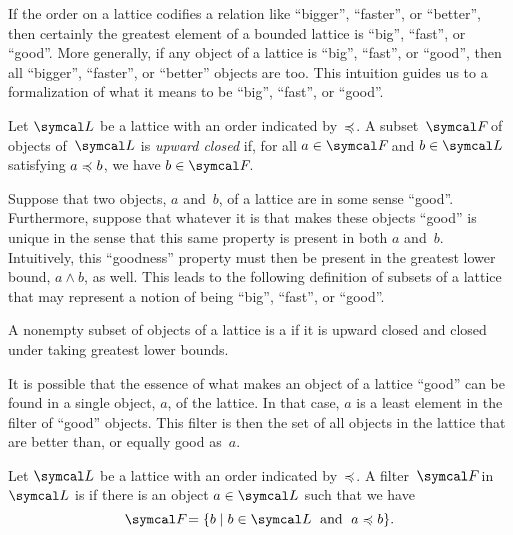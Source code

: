 If the order on a lattice codifies a relation like \enquote{bigger}, \enquote{faster}, or \enquote{better}, then certainly the greatest element of a bounded lattice is \enquote{big}, \enquote{fast}, or \enquote{good}.
More generally, if any object of a lattice is \enquote{big}, \enquote{fast}, or \enquote{good}, then all \enquote{bigger}, \enquote{faster}, or \enquote{better} objects are too.
This intuition guides us to a formalization of what it means to be \enquote{big}, \enquote{fast}, or \enquote{good}.
\begin{definition}
  Let $\calL$ be a lattice with an order indicated by~$\preccurlyeq$.
  A subset~$\calF$ of objects of~$\calL$ is \emph{upward closed} if, for all $a \in \calF$ and $b \in \calL$ satisfying $a \preccurlyeq b$, we have $b \in \calF$.
\end{definition}

Suppose that two objects, $a$ and~$b$, of a lattice are in some sense \enquote{good}.
Furthermore, suppose that whatever it is that makes these objects \enquote{good} is unique in the sense that this same property is present in both $a$ and~$b$.
Intuitively, this \enquote{goodness} property must then be present in the greatest lower bound, $a \land b$, as well.
This leads to the following definition of subsets of a lattice that may represent a notion of being \enquote{big}, \enquote{fast}, or \enquote{good}.
\begin{definition}
\label{def:filter}%
  A nonempty subset of objects of a lattice is a  if it is upward closed and closed under taking greatest lower bounds.
\end{definition}

It is possible that the essence of what makes an object of a lattice \enquote{good} can be found in a single object, $a$, of the lattice.
In that case, $a$ is a least element in the filter of \enquote{good} objects.
This filter is then the set of all objects in the lattice that are better than, or equally good as~$a$.
\begin{definition}
\label{def:principal}%
  Let $\calL$ be a lattice with an order indicated by~$\preccurlyeq$.
  A filter~$\calF$ in~$\calL$ is  if there is an object $a \in \calL$ such that we have
  \begin{equation*}
    \calF = \{b \st b \in \calL \reland a \quasile b\}.
  \end{equation*}
\end{definition}

